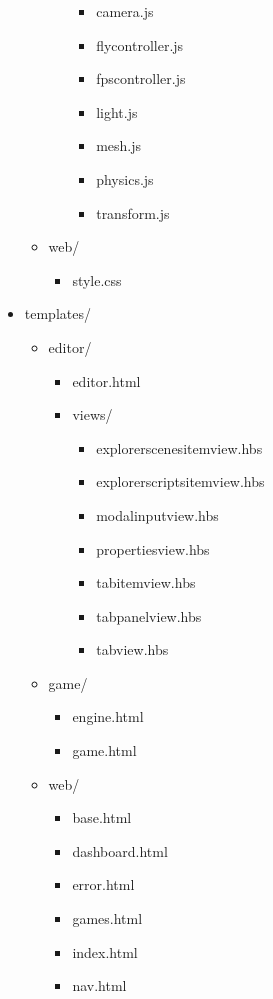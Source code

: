 \begin{itemize}
\begin{itemize}
\begin{itemize}
\begin{itemize}
				\itemsep-0.6em
				\item camera.js
				\item flycontroller.js
				\item fpscontroller.js
				\item light.js
				\item mesh.js
				\item physics.js
				\item transform.js
			\end{itemize}
		\end{itemize}
		\item web/
		\begin{itemize}
			\itemsep-0.6em
			\item style.css
		\end{itemize}
	\end{itemize}
	\item templates/
	\begin{itemize}
		\itemsep-0.6em
		\item editor/
		\begin{itemize}
			\itemsep-0.6em
			\item editor.html
			\item views/
			\begin{itemize}
				\itemsep-0.6em
				\item explorerscenesitemview.hbs
				\item explorerscriptsitemview.hbs
				\item modalinputview.hbs
				\item propertiesview.hbs
				\item tabitemview.hbs
				\item tabpanelview.hbs
				\item tabview.hbs
			\end{itemize}
		\end{itemize}
		\item game/
		\begin{itemize}
			\itemsep-0.6em
			\item engine.html
			\item game.html
		\end{itemize}
		\item web/
		\begin{itemize}
			\itemsep-0.6em
			\item base.html
			\item dashboard.html
			\item error.html
			\item games.html
			\item index.html
			\item nav.html
		\end{itemize}
	\end{itemize}
\end{itemize}

